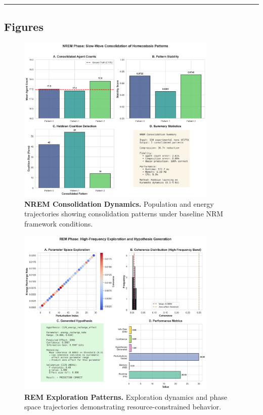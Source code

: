 \documentclass[
]{article}
\begin{document}
\begin{center}\rule{0.5\linewidth}{0.5pt}\end{center}

\subsection{Figures}\label{figures}

\begin{figure}[htbp]
\centering
\includegraphics[width=0.85\textwidth]{figures/paper7_fig1_nrem_consolidation.png}
\caption{\textbf{NREM Consolidation Dynamics.} Population and energy trajectories showing consolidation patterns under baseline NRM framework conditions.}
\label{fig:consolidation}
\end{figure}

\begin{figure}[htbp]
\centering
\includegraphics[width=0.85\textwidth]{figures/paper7_fig2_rem_exploration.png}
\caption{\textbf{REM Exploration Patterns.} Exploration dynamics and phase space trajectories demonstrating resource-constrained behavior.}
\label{fig:exploration}
\end{figure}
\end{document}
